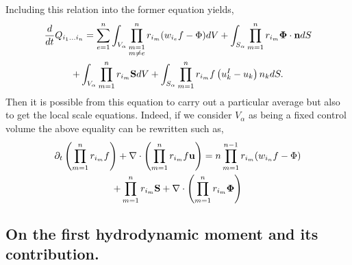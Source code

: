 Including this relation into the former equation yields, 
\begin{multline*}
    \frac{d}{d t} Q_{i_1\ldots i_n}
    = \sum_{e=1}^{n} \int_{V_\alpha} \prod^{n}_{\substack{ m=1 \\   m \neq e}} r_{i_m} (w_{i_e}f  - \Phi)dV
    +\int_{S_\alpha} \prod_{m=1}^{n} r_{i_m} \mathbf{\Phi} \cdot \textbf{n}dS\\
    + \int_{V_\alpha} \prod_{m=1}^{n} r_{i_m} \textbf{S} dV
    +\int_{S_\alpha} \prod_{m=1}^{n} r_{i_m} f \left(u^I_k - u_k\right) n_k dS.
\end{multline*}
Then it is possible from this equation to carry out a particular average but also to get the local scale equations. 
Indeed, if we consider $V_\alpha$ as being a fixed control volume the above equality can be rewritten such as, 
\begin{multline*}
    \partial_t \left(\prod_{m=1}^{n} r_{i_m}f\right)
    + \mathbf{\nabla} \cdot \left(\prod_{m=1}^{n} r_{i_m}f \textbf{u}\right)
    = n  \prod_{m=1}^{n-1} r_{i_m}  (w_{i_n}f  - \Phi)\\
    + \prod_{m=1}^{n} r_{i_m} \textbf{S} 
    + \mathbf{\nabla} \cdot \left( \prod_{m=1}^{n} r_{i_m} \mathbf{\Phi} \right)
    \label{ap:eq:dt_rrf}
\end{multline*}


\subsection{On the first hydrodynamic moment and its contribution.}

